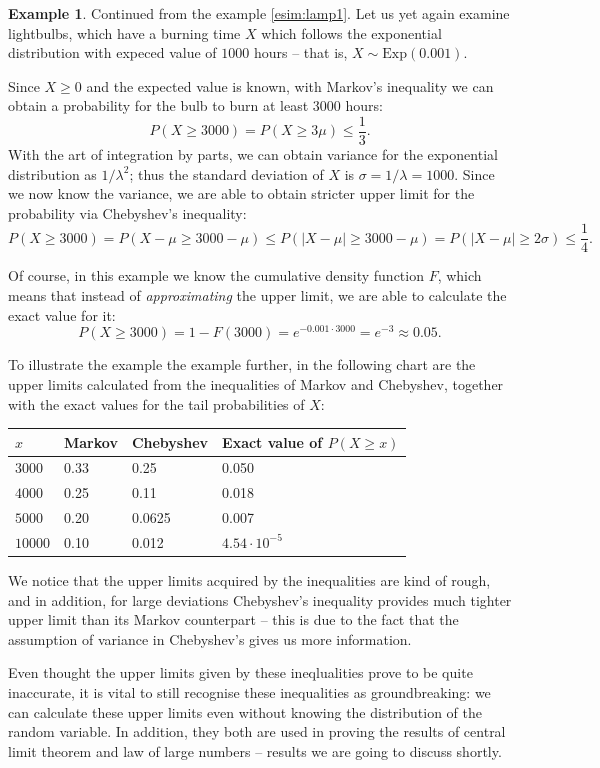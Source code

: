 \documentclass[12pt,a4paper,leqno]{report}
\theoremstyle{plain}
\theoremstyle{definition}
\newtheorem{esim}[equation]{Example}
\begin{document}
\begin{esim}
Continued from the example \ref{esim:lamp1}. Let us yet again examine lightbulbs, which have a burning time $X$ which follows the exponential distribution with expeced value of $1000$ hours -- that is, $X \sim \text{Exp}(0.001)$. 

Since $X \geq 0$ and the expected value is known, with Markov's inequality we can obtain a probability for the bulb to burn at least $3000$ hours:
\[
P(X \geq 3000) = P(X \geq 3\mu) \leq \frac{1}{3}.
\]
With the art of integration by parts, we can obtain variance for the exponential distribution as $1/\lambda^2$; thus the standard deviation of  $X$ is $\sigma = 1/\lambda = 1000$. Since we now know the variance, we are able to obtain stricter upper limit for the probability via Chebyshev's inequality:
\[
P(X \geq 3000) = P(X-\mu \geq 3000-\mu) \leq P(|X-\mu| \geq 3000-\mu) = P(|X-\mu| \geq 2\sigma) \leq \frac{1}{4}.
\]

Of course, in this example we know the cumulative density function $F$, which means that instead of \emph{approximating} the upper limit, we are able to calculate the exact value for it:
\[
P(X \geq 3000) = 1 - F(3000) = e^{-0.001 \cdot 3000} = e^{-3} \approx 0.05.
\]

To illustrate the example the example further, in the following chart are the upper limits calculated from the inequalities of Markov and Chebyshev, together with the exact values for the tail probabilities of $X$:

\bigskip

\begin{tabular}{l l l L{6cm}}
\toprule
$x$ & Markov & Chebyshev & Exact value of $P(X \geq x)$\\
\midrule
$3000$ & 0.33 & 0.25 & 0.050\\
$4000$ & 0.25 & 0.11 & 0.018\\
$5000$ & 0.20 & 0.0625 & 0.007\\
$10000$ & 0.10 & 0.012 & $4.54 \cdot 10^{-5}$\\
\bottomrule 
\end{tabular}

\bigskip

We notice that the upper limits acquired by the inequalities are kind of rough, and in addition, for large deviations Chebyshev's inequality provides much tighter upper limit than its Markov counterpart -- this is due to the fact that the assumption of variance in Chebyshev's gives us more information.

Even thought the upper limits given by these ineqlualities prove to be quite inaccurate, it is vital to still recognise these inequalities as groundbreaking: we can calculate these upper limits even without knowing the distribution of the random variable. In addition, they both are used in proving the results of central limit theorem and law of large numbers -- results we are going to discuss shortly.
\end{esim}
\end{document}
